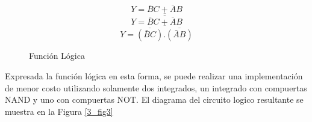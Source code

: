 


\newcommand{\mybox}
{%
    \begin{figure}
\begin{center}
\[Y = \bar{B}C + \bar{A}B \]
\[Y = \overline{\overline{\bar{B}C + \bar{A}B}} \]
\[Y = \overline{\overline{(\bar{B}C)}.\overline{(\bar{A}B)}} \]
\caption{Función Lógica}
\label{3_fig6}
\end{center}
    \end{figure}\par\noindent
}

\mybox%

Expresada la función lógica en esta forma, se puede realizar una implementación de menor costo utilizando solamente dos integrados, un integrado con compuertas NAND y uno con compuertas NOT. El diagrama del circuito logico resultante se muestra en la Figura \ref{3_fig3}



